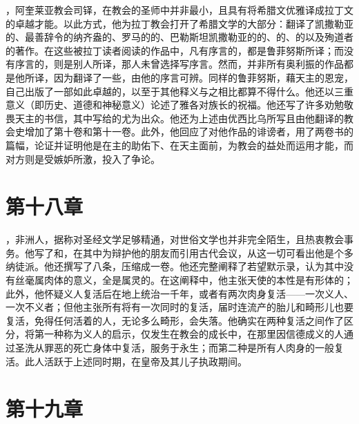 ，阿奎莱亚教会司铎，在教会的圣师中并非最小，且具有将希腊文优雅译成拉丁文的卓越才能。以此方式，他为拉丁教会打开了希腊文学的大部分：翻译了凯撒勒亚的、最善辞令的纳齐盎的、罗马的的、巴勒斯坦凯撒勒亚的的、的、的以及殉道者的著作。在这些被拉丁读者阅读的作品中，凡有序言的，都是鲁菲努斯所译；而没有序言的，则是别人所译，那人未曾选择写序言。然而，并非所有奥利振的作品都是他所译，因为翻译了一些，由他的序言可辨。同样的鲁菲努斯，藉天主的恩宠，自己出版了一部如此卓越的，以至于其他释义与之相比都算不得什么。他还以三重意义（即历史、道德和神秘意义）论述了雅各对族长的祝福。他还写了许多劝勉敬畏天主的书信，其中写给的尤为出众。他还为上述由优西比乌所写且由他翻译的教会史增加了第十卷和第十一卷。此外，他回应了对他作品的诽谤者，用了两卷书的篇幅，论证并证明他是在主的助佑下、在天主面前，为教会的益处而运用才能，而对方则是受嫉妒所激，投入了争论。\par


\section{第十八章}

，非洲人，据称对圣经文学足够精通，对世俗文学也并非完全陌生，且热衷教会事务。他写了和，在其中为辩护他的朋友而引用古代会议，从这一切可看出他是个多纳徒派。他还撰写了八条，压缩成一卷。他还完整阐释了若望默示录，认为其中没有丝毫属肉体的意义，全是属灵的。在这阐释中，他主张天使的本性是有形体的；此外，他怀疑义人复活后在地上统治一千年，或者有两次肉身复活——一次义人、一次不义者；但他主张所有将有一次同时的复活，届时连流产的胎儿和畸形儿也要复活，免得任何活着的人，无论多么畸形，会失落。他确实在两种复活之间作了区分，将第一种称为义人的启示，仅发生在教会的成长中，在那里因信德成义的人通过圣洗从罪恶的死亡身体中复活，服务于永生；而第二种是所有人肉身的一般复活。此人活跃于上述同时期，在皇帝及其儿子执政期间。\par


\section{第十九章}

